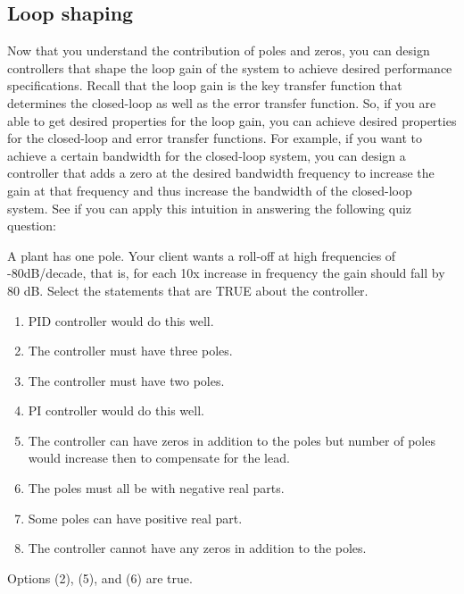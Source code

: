 \documentclass{ee122_notes}
\begin{document}
\subsection{Loop shaping}
Now that you understand the contribution of poles and zeros, you can design controllers that shape the loop gain of the system to achieve desired performance specifications. Recall that the loop gain is the key transfer function that determines the closed-loop as well as the error transfer function. So, if you are able to get desired properties for the loop gain, you can achieve desired properties for the closed-loop and error transfer functions. For example, if you want to achieve a certain bandwidth for the closed-loop system, you can design a controller that adds a zero at the desired bandwidth frequency to increase the gain at that frequency and thus increase the bandwidth of the closed-loop system. See if you can apply this intuition in answering the following quiz question:
\begin{popquiz}
A plant has one pole. Your client wants a roll-off at high frequencies of -80dB/decade, that is, for each 10x increase in frequency the gain should fall by 80 dB. Select the statements that are TRUE about the controller.
\begin{enumerate}
  \item PID controller would do this well.

  \item The controller must have three poles.

  \item The controller must have two poles.

  \item PI controller would do this well.

  \item The controller can have zeros in addition to the poles but number of poles would increase then to compensate for the lead.

  \item The poles must all be with negative real parts.

  \item Some poles can have positive real part.

  \item The controller cannot have any zeros in addition to the poles.
\end{enumerate}
\popqsplit
Options (2), (5), and (6) are true. 
\end{popquiz}  
\end{document}
